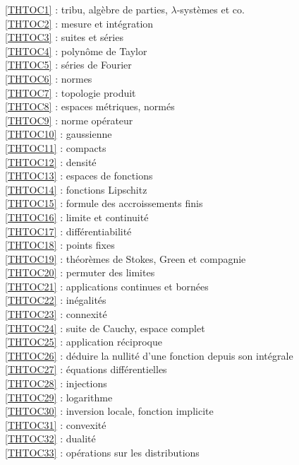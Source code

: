 \ref {THTOC1} : tribu, algèbre de parties, \( \lambda \)-systèmes et co.\\
\ref {THTOC2} : mesure et intégration\\
\ref {THTOC3} : suites et séries\\
\ref {THTOC4} : polynôme de Taylor\\
\ref {THTOC5} : séries de Fourier\\
\ref {THTOC6} : normes\\
\ref {THTOC7} : topologie produit\\
\ref {THTOC8} : espaces métriques, normés\\
\ref {THTOC9} : norme opérateur\\
\ref {THTOC10} : gaussienne\\
\ref {THTOC11} : compacts\\
\ref {THTOC12} : densité\\
\ref {THTOC13} : espaces de fonctions\\
\ref {THTOC14} : fonctions Lipschitz\\
\ref {THTOC15} : formule des accroissements finis\\
\ref {THTOC16} : limite et continuité\\
\ref {THTOC17} : différentiabilité\\
\ref {THTOC18} : points fixes\\
\ref {THTOC19} : théorèmes de Stokes, Green et compagnie\\
\ref {THTOC20} : permuter des limites\\
\ref {THTOC21} : applications continues et bornées\\
\ref {THTOC22} : inégalités\\
\ref {THTOC23} : connexité\\
\ref {THTOC24} : suite de Cauchy, espace complet\\
\ref {THTOC25} : application réciproque\\
\ref {THTOC26} : déduire la nullité d'une fonction depuis son intégrale\\
\ref {THTOC27} : équations différentielles\\
\ref {THTOC28} : injections\\
\ref {THTOC29} : logarithme\\
\ref {THTOC30} : inversion locale, fonction implicite\\
\ref {THTOC31} : convexité\\
\ref {THTOC32} : dualité\\
\ref {THTOC33} : opérations sur les distributions\\
